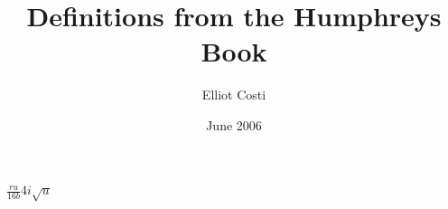 \documentclass[10pt]{article}
\begin{document}
\title{Definitions from the Humphreys Book} 
\author{Elliot Costi}
\date{June 2006}
\maketitle

\section{}
\label{}

$\frac{ru}{16b}4i\sqrt{u}$
\end{document}
